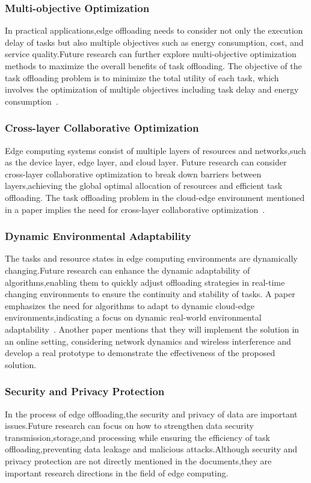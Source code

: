\documentclass[journal]{IEEEtran}
\begin{document}
\subsubsection{Multi-objective Optimization}
In practical applications,edge offloading needs to consider not only the execution delay of tasks but also multiple objectives such as energy consumption, cost, and service quality.Future research can further explore multi-objective optimization methods to maximize the overall benefits of task offloading. The objective of the task offloading problem is to minimize the total utility of each task, which involves the optimization of multiple objectives including task delay and energy consumption~\cite{zhou02}.

\subsubsection{Cross-layer Collaborative Optimization}
Edge computing systems consist of multiple layers of resources and networks,such as the device layer, edge layer, and cloud layer. Future research can consider cross-layer collaborative optimization to break down barriers between layers,achieving the global optimal allocation of resources and efficient task offloading. The task offloading problem in the cloud-edge environment mentioned in a paper implies the need for cross-layer collaborative optimization~\cite{zhou01}.

\subsubsection{Dynamic Environmental Adaptability}
The tasks and resource states in edge computing environments are dynamically changing.Future research can enhance the dynamic adaptability of algorithms,enabling them to quickly adjust offloading strategies in real-time changing environments to ensure the continuity and stability of tasks. A paper emphasizes the need for algorithms to adapt to dynamic cloud-edge environments,indicating a focus on dynamic real-world environmental adaptability~\cite{zhou01}. Another paper mentions that they will implement the solution in an online setting, considering network dynamics and wireless interference and develop a real prototype to demonstrate the effectiveness of the proposed solution.~\cite{xyj02}

\subsubsection{Security and Privacy Protection}
In the process of edge offloading,the security and privacy of data are important issues.Future research can focus on how to strengthen data security transmission,storage,and processing while ensuring the efficiency of task offloading,preventing data leakage and malicious attacks.Although security and privacy protection are not directly mentioned in the documents,they are important research directions in the field of edge computing.
\end{document}
